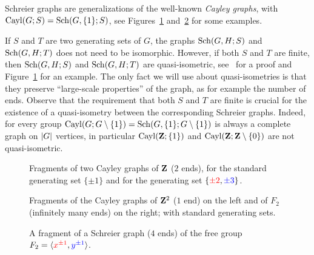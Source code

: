 Schreier graphs are generalizations of the well-known \emph{Cayley graphs}, with $\operatorname{Cayl}(G;S)=\operatorname{Sch}(G,\{1\};S)$, see Figures~\ref{Figure:CayleyOfZ} and~\ref{Figure:CayleyOfZ2} for some examples.

If $S$ and $T$ are two generating sets of $G$, the graphs $\operatorname{Sch}(G,H;S)$ and $\operatorname{Sch}(G,H;T)$ does not need to be isomorphic. However, if both $S$ and $T$ are finite, then $\operatorname{Sch}(G,H;S)$ and $\operatorname{Sch}(G,H;T)$ are quasi-isometric, see~\cite[IV.B.21.iii]{DelaHarpe2000} for a proof and Figure~\ref{Figure:CayleyOfZ} for an example. The only fact we will use about quasi-isometries is that they preserve ``large-scale properties'' of the graph, as for example the number of ends.
Observe that the requirement that both $S$ and $T$ are finite is crucial for the existence of a quasi-isometry between the corresponding Schreier graphs. Indeed, for every group  $\operatorname{Cayl}(G;G\setminus\{1\})=\operatorname{Sch}(G,\{1\};G\setminus\{1\})$ is always a complete graph on $\lvert G\rvert$ vertices, in particular  $\operatorname{Cayl}(\mathbf{Z};\{1\})$ and $\operatorname{Cayl}(\mathbf{Z};\mathbf{Z}\setminus\{0\})$ are not quasi-isometric.

%
%
\begin{figure}[htbp]\centering

\caption{Fragments of two Cayley graphs of $\mathbf{Z}$ ($2$ ends), for the standard generating set $\{\pm1\}$ and for the generating set $\{\textcolor{red}{\pm2},\textcolor{blue}{\pm3}\}$.}
\label{Figure:CayleyOfZ}
\end{figure}
\begin{figure}[htbp]\centering
\begin{subfigure}{0.5\textwidth}
\centering

\end{subfigure}%
\begin{subfigure}{0.5\textwidth}
\centering
\scalebox{0.8}{}
\end{subfigure}
\caption{Fragments of the Cayley graphs of $\mathbf{Z}^2$ ($1$ end) on the left and of $F_2$ (infinitely many ends) on the right; with standard generating sets.}
\label{Figure:CayleyOfZ2}
\end{figure}
\begin{figure}[htbp]\centering

\caption{A fragment of a Schreier graph ($4$ ends) of the free group $F_2=\langle \textcolor{red}{x^{\pm1}},\textcolor{blue}{y^{\pm1}}\rangle$.}
\label{Figure:SchreierOfF2}
\end{figure}
%
%

